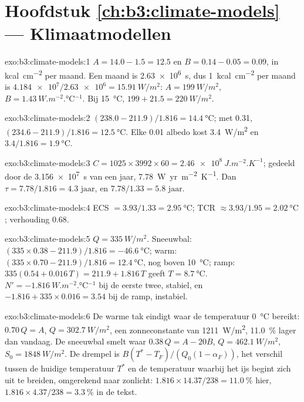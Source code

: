 \section*{Hoofdstuk \ref{ch:b3:climate-models} --- Klimaatmodellen}

\begin{solution}{exo:b3:climate-models:1}
$A = 14.0 - 1.5 = \num{12.5}$ en $B = 0.14 - 0.05 = \num{0.09}$, in
\unit{kcal.cm^{-2}} per maand. Een maand is \qty{2.63e6}{s}, dus
\qty{1}{kcal.cm^{-2}} per maand is $\num{4.184e7}/\num{2.63e6} =
\qty{15.91}{W/m^2}$: $A = \qty{199}{W/m^2}$, $B =
\qty{1.43}{W.m^{-2}.\celsius^{-1}}$. Bij \qty{15}{\celsius}, $199 + 21.5 =
\qty{220}{W/m^2}$.
\end{solution}

\begin{solution}{exo:b3:climate-models:2}
$(238.0 - 211.9)/1.816 = \qty{14.4}{\celsius}$; met 0.31, $(234.6 -
211.9)/1.816 = \qty{12.5}{\celsius}$. Elke 0.01 albedo kost
\qty{3.4}{W/m^2} en $3.4/1.816 = \qty{1.9}{\celsius}$.
\end{solution}

\begin{solution}{exo:b3:climate-models:3}
$C = 1025\times3992\times60 = \qty{2.46e8}{J.m^{-2}.K^{-1}}$; gedeeld door
de \qty{3.156e7}{s} van een jaar, \qty{7.78}{W.yr.m^{-2}.K^{-1}}. Dan $\tau
= 7.78/1.816 = \num{4.3}\text{ jaar}$, en $7.78/1.33 = \num{5.8}\text{ jaar}$.
\end{solution}

\begin{solution}{exo:b3:climate-models:4}
ECS $= 3.93/1.33 = \qty{2.95}{\celsius}$; TCR $\approx 3.93/1.95 =
\qty{2.02}{\celsius}$; verhouding \num{0.68}.
\end{solution}

\begin{solution}{exo:b3:climate-models:5}
$Q = \qty{335}{W/m^2}$. Sneeuwbal: $(335\times0.38 - 211.9)/1.816 =
\qty{-46.6}{\celsius}$; warm: $(335\times0.70 - 211.9)/1.816 =
\qty{12.4}{\celsius}$, nog boven \qty{10}{\celsius}; ramp: $335(0.54 +
0.016\,T) = 211.9 + 1.816\,T$ geeft $T = \qty{8.7}{\celsius}$. $N' =
\qty{-1.816}{W.m^{-2}.\celsius^{-1}}$ bij de eerste twee, stabiel, en $-1.816
+ 335\times0.016 = \num{+3.54}$ bij de ramp, instabiel.
\end{solution}

\begin{solution}{exo:b3:climate-models:6}
De warme tak eindigt waar de temperatuur \qty{0}{\celsius} bereikt:
$0.70\,Q = A$, $Q = \qty{302.7}{W/m^2}$, een zonneconstante van
\qty{1211}{W/m^2}, \qty{11.0}{\percent} lager dan vandaag. De sneeuwbal smelt
waar $0.38\,Q = A - 20B$, $Q = \qty{462.1}{W/m^2}$, $S_0 =
\qty{1848}{W/m^2}$. De drempel is $B(T^* - T_F)/(Q_0(1 - \alpha_F))$,
het verschil tussen de huidige temperatuur $T^*$ en de temperatuur waarbij het
ijs begint zich uit te breiden, omgerekend naar zonlicht: $1.816\times14.37/238 =
\qty{11.0}{\percent}$ hier, $1.816\times4.37/238 = \qty{3.3}{\percent}$ in
de tekst.
\end{solution}

